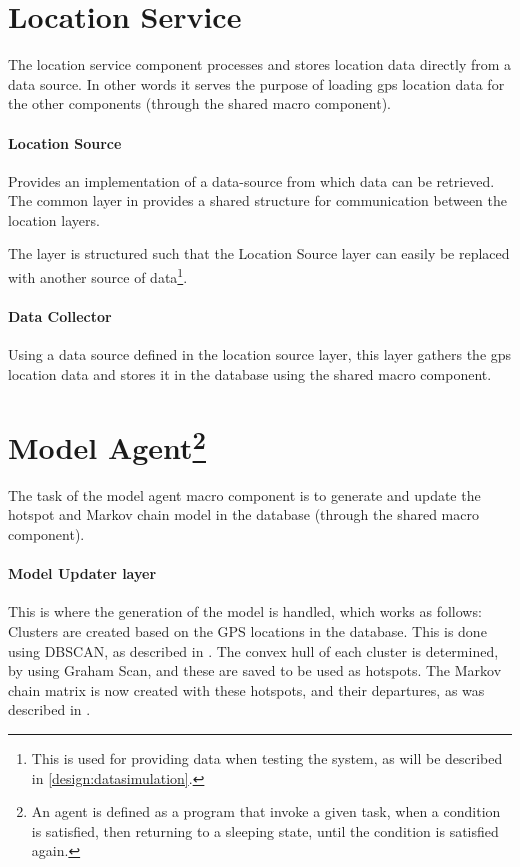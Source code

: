\section{Location Service} 
The location service component processes and stores location data directly from a data source.
In other words it serves the purpose of loading gps location data for the other components (through the shared macro component).

\paragraph{Location Source} Provides an implementation of a data-source from which data can be retrieved.
The common layer in provides a shared structure for communication between the location layers.

The layer is structured such that the Location Source layer can easily be replaced with another source of data\footnote{This is used for providing data when testing the system, as will be described in \cref{design:datasimulation}.}.

\paragraph{Data Collector} Using a data source defined in the location source layer, this layer gathers the gps location data and stores it in the database using the shared macro component.

\section[Model Agent]{Model Agent\footnote{An agent is defined as a program that invoke a given task, when a condition is satisfied, then returning to a sleeping state, until the condition is satisfied again.\cite{definitionagent}}}
The task of the model agent macro component is to generate and update the hotspot and Markov chain model in the database (through the shared macro component).

\paragraph{Model Updater layer} This is where the generation of the model is handled, which works as follows:\\
Clusters are created based on the GPS locations in the database.
This is done using DBSCAN, as described in .
The convex hull of each cluster is determined, by using Graham Scan, and these are saved to be used as hotspots.
The Markov chain matrix is now created with these hotspots, and their departures, as was described in .

